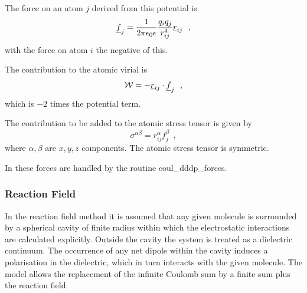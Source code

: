 The force on an atom $j$ derived from this potential is
\begin{equation}
\mbox{$\underline{f}$}_{j} = \frac{1}{2\pi\epsilon_{0}\epsilon} \frac{q_{i}q_{j}}{r_{ij}^{4}} \mbox{$\underline{r}$}_{ij}~~,
\end{equation}
with the force on atom $i$ the negative of this.

The contribution to the atomic virial is
\begin{equation}
{\cal W} = -\mbox{$\underline{r}$}_{ij} \cdot \mbox{$\underline{f}$}_{j}~~,
\end{equation}
which is $-2$ times the potential term.

The contribution to be added to the atomic stress
tensor is given by
\begin{equation}
\sigma^{\alpha \beta} = r_{ij}^{\alpha} f_{j}^{\beta}~~,
\end{equation}
where $\alpha,\beta$ are $x,y,z$ components.  The atomic stress
tensor is symmetric.

In \D these forces are handled by the routine {\sc
coul\_dddp\_forces}.

\subsubsection{Reaction Field}

In the reaction field method it is assumed
that any given molecule is surrounded by a spherical cavity of
finite radius within which the electrostatic interactions are
calculated explicitly.  Outside the cavity the system is treated
as a dielectric continuum.
The occurrence of any net dipole within the cavity induces a
polarisation in the dielectric, which in turn interacts with the
given molecule.  The model allows the replacement of the infinite
Coulomb sum by a finite sum plus the reaction field.

